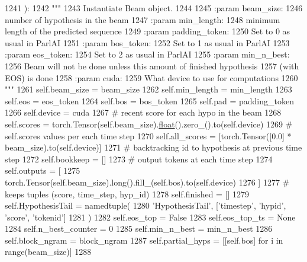 \begin{DoxyCode}
1241     ):
1242         \textcolor{stringliteral}{"""}
1243 \textcolor{stringliteral}{        Instantiate Beam object.}
1244 \textcolor{stringliteral}{}
1245 \textcolor{stringliteral}{        :param beam\_size:}
1246 \textcolor{stringliteral}{            number of hypothesis in the beam}
1247 \textcolor{stringliteral}{        :param min\_length:}
1248 \textcolor{stringliteral}{            minimum length of the predicted sequence}
1249 \textcolor{stringliteral}{        :param padding\_token:}
1250 \textcolor{stringliteral}{            Set to 0 as usual in ParlAI}
1251 \textcolor{stringliteral}{        :param bos\_token:}
1252 \textcolor{stringliteral}{            Set to 1 as usual in ParlAI}
1253 \textcolor{stringliteral}{        :param eos\_token:}
1254 \textcolor{stringliteral}{            Set to 2 as usual in ParlAI}
1255 \textcolor{stringliteral}{        :param min\_n\_best:}
1256 \textcolor{stringliteral}{            Beam will not be done unless this amount of finished hypothesis}
1257 \textcolor{stringliteral}{            (with EOS) is done}
1258 \textcolor{stringliteral}{        :param cuda:}
1259 \textcolor{stringliteral}{            What device to use for computations}
1260 \textcolor{stringliteral}{        """}
1261         self.beam\_size = beam\_size
1262         self.min\_length = min\_length
1263         self.eos = eos\_token
1264         self.bos = bos\_token
1265         self.pad = padding\_token
1266         self.device = cuda
1267         \textcolor{comment}{# recent score for each hypo in the beam}
1268         self.scores = torch.Tensor(self.beam\_size).\hyperlink{namespaceprojects_1_1controllable__dialogue_1_1make__control__dataset_aa2b7207688c641dbc094ab44eca27113}{float}().zero\_().to(self.device)
1269         \textcolor{comment}{# self.scores values per each time step}
1270         self.all\_scores = [torch.Tensor([0.0] * beam\_size).to(self.device)]
1271         \textcolor{comment}{# backtracking id to hypothesis at previous time step}
1272         self.bookkeep = []
1273         \textcolor{comment}{# output tokens at each time step}
1274         self.outputs = [
1275             torch.Tensor(self.beam\_size).long().fill\_(self.bos).to(self.device)
1276         ]
1277         \textcolor{comment}{# keeps tuples (score, time\_step, hyp\_id)}
1278         self.finished = []
1279         self.HypothesisTail = namedtuple(
1280             \textcolor{stringliteral}{'HypothesisTail'}, [\textcolor{stringliteral}{'timestep'}, \textcolor{stringliteral}{'hypid'}, \textcolor{stringliteral}{'score'}, \textcolor{stringliteral}{'tokenid'}]
1281         )
1282         self.eos\_top = \textcolor{keyword}{False}
1283         self.eos\_top\_ts = \textcolor{keywordtype}{None}
1284         self.n\_best\_counter = 0
1285         self.min\_n\_best = min\_n\_best
1286         self.block\_ngram = block\_ngram
1287         self.partial\_hyps = [[self.bos] \textcolor{keywordflow}{for} i \textcolor{keywordflow}{in} range(beam\_size)]
1288 
\end{DoxyCode}


